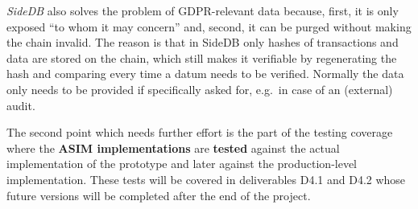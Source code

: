 \textit{SideDB} also solves the problem of GDPR-relevant data because, first, it is only exposed ``to whom it may concern'' and, second, it can be purged without making the chain invalid. The reason is that in SideDB only hashes of transactions and data are stored on the chain, which still makes it verifiable by regenerating the hash and comparing every time a datum needs to be verified. Normally the data only needs to be provided if specifically asked for, e.g.\ in case of an (external) audit.

The second point which needs further effort is the part of the testing coverage where the \textbf{ASIM implementations} are \textbf{tested} against the actual implementation of the prototype and later against the production-level implementation. These tests will be covered in deliverables D4.1 and D4.2 whose future versions will be completed after the end of the project.






